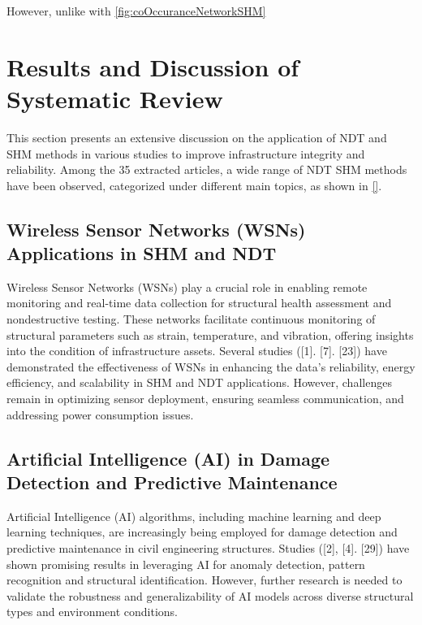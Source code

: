\documentclass[journal, a4paper]{IEEEtran}
\begin{document}
However, unlike with \autoref{fig:coOccuranceNetworkSHM} \lipsum[1]





\section{Results and Discussion of Systematic Review}
This section presents an extensive discussion on the application of NDT
and SHM methods in various studies to improve infrastructure integrity and reliability.
Among the 35 extracted articles, a wide range of NDT SHM methods have been observed, categorized under different main topics,
as shown in \autoref{}. 


\subsection{Wireless Sensor Networks (WSNs) Applications in SHM and NDT}
Wireless Sensor Networks (WSNs) play a crucial role in enabling remote monitoring and real-time data collection for
structural health assessment and nondestructive testing. These networks facilitate continuous monitoring of structural
parameters such as strain, temperature, and vibration, offering insights into the condition of infrastructure assets.
Several studies ([1]. [7]. [23]) have demonstrated the effectiveness of WSNs in enhancing the data’s reliability, energy
efficiency, and scalability in SHM and NDT applications. However, challenges remain in optimizing sensor deployment,
ensuring seamless communication, and addressing power consumption issues.

\subsection{Artificial Intelligence (AI) in Damage Detection and Predictive Maintenance}
Artificial Intelligence (AI) algorithms, including machine learning and deep learning techniques,
are increasingly being employed for damage detection and predictive maintenance in civil engineering structures.
Studies ([2], [4]. [29]) have shown promising results in leveraging AI for anomaly detection,
pattern recognition and structural identification.
However, further research is needed to validate the robustness and generalizability of
AI models across diverse structural types and environment conditions.
\end{document}
